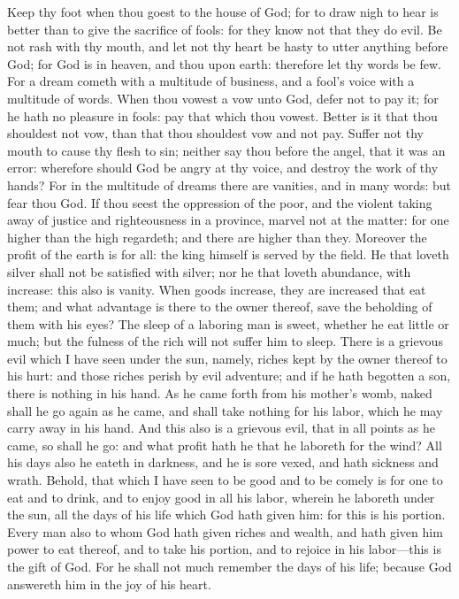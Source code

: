 Keep thy foot when thou goest to the house of God; for to draw nigh to hear is better than to give the sacrifice of fools: for they know not that they do evil. Be not rash with thy mouth, and let not thy heart be hasty to utter anything before God; for God is in heaven, and thou upon earth: therefore let thy words be few. For a dream cometh with a multitude of business, and a fool’s voice with a multitude of words. When thou vowest a vow unto God, defer not to pay it; for he hath no pleasure in fools: pay that which thou vowest. Better is it that thou shouldest not vow, than that thou shouldest vow and not pay. Suffer not thy mouth to cause thy flesh to sin; neither say thou before the angel, that it was an error: wherefore should God be angry at thy voice, and destroy the work of thy hands? For in the multitude of dreams there are vanities, and in many words: but fear thou God.  If thou seest the oppression of the poor, and the violent taking away of justice and righteousness in a province, marvel not at the matter: for one higher than the high regardeth; and there are higher than they. Moreover the profit of the earth is for all: the king himself is served by the field.  He that loveth silver shall not be satisfied with silver; nor he that loveth abundance, with increase: this also is vanity. When goods increase, they are increased that eat them; and what advantage is there to the owner thereof, save the beholding of them with his eyes? The sleep of a laboring man is sweet, whether he eat little or much; but the fulness of the rich will not suffer him to sleep.  There is a grievous evil which I have seen under the sun, namely, riches kept by the owner thereof to his hurt: and those riches perish by evil adventure; and if he hath begotten a son, there is nothing in his hand. As he came forth from his mother’s womb, naked shall he go again as he came, and shall take nothing for his labor, which he may carry away in his hand. And this also is a grievous evil, that in all points as he came, so shall he go: and what profit hath he that he laboreth for the wind? All his days also he eateth in darkness, and he is sore vexed, and hath sickness and wrath.  Behold, that which I have seen to be good and to be comely is for one to eat and to drink, and to enjoy good in all his labor, wherein he laboreth under the sun, all the days of his life which God hath given him: for this is his portion. Every man also to whom God hath given riches and wealth, and hath given him power to eat thereof, and to take his portion, and to rejoice in his labor—this is the gift of God. For he shall not much remember the days of his life; because God answereth him in the joy of his heart. 

